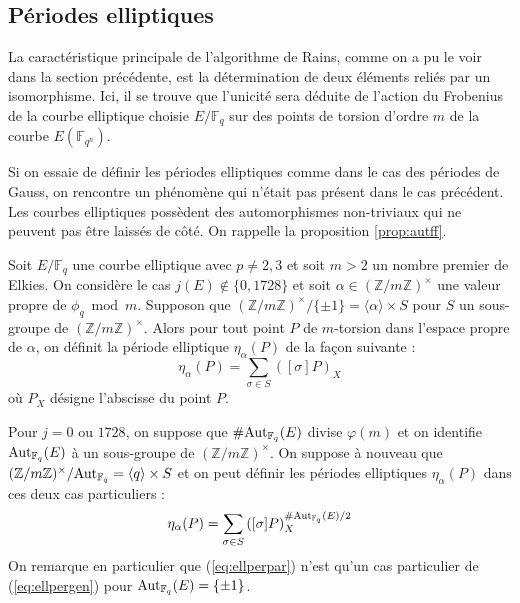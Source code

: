 \documentclass[a4paper]{article} %
\numberwithin{section}{part}
\numberwithin{equation}{section}
\newcommand\zmodninv[1]{(\mathbb{Z}/#1\mathbb{Z})^{\times}}
\newcommand\GF[1]{\mathbb{F}_{#1}}
\newcommand\groupgen[1]{\langle{#1}\rangle}
\begin{document}
\subsection{Périodes elliptiques}
\label{sec:perell}
La caractéristique principale de l'algorithme de Rains, comme on a pu le voir
dans la section précédente, est la détermination de deux éléments reliés
par un isomorphisme. Ici, il se trouve que l'unicité sera déduite de
l'action du Frobenius de la courbe elliptique choisie $E/\GF{q}$ sur des points
de torsion d'ordre $m$ de la courbe $E(\GF{q^n})$.\par
Si on essaie de définir les périodes elliptiques comme dans le cas des périodes
de Gauss, on rencontre un phénomène qui n'était pas présent dans le cas
précédent. Les courbes elliptiques possèdent des automorphismes non-triviaux qui
ne peuvent pas être laissés de côté. On rappelle la proposition
\ref{prop:autff}.\par
\begin{defn}
Soit $E/\GF{q}$ une courbe elliptique avec $p\neq2, 3$ et soit $m > 2$
un nombre premier de Elkies. On considère le cas 
$j(E)\notin\lbrace{0, 1728}\rbrace$ et soit $\alpha\in\zmodninv{m}$ une valeur 
propre de $\phi_q\bmod{m}$. Supposon que $\zmodninv{m}/\lbrace{\pm1}\rbrace = 
\groupgen{\alpha}\times S$ pour $S$ un sous-groupe de $\zmodninv{m}$. Alors pour
tout point $P$ de $m$-torsion dans l'espace propre de $\alpha$, on définit la 
période elliptique $\eta_{\alpha}(P)$ de la façon suivante :
\begin{equation}
\label{eq:ellperpar}
\eta_{\alpha}(P) = \sum_{\sigma\in S}{([\sigma]P)_X}
\end{equation}
où $P_X$ désigne l'abscisse du point $P$.\par
Pour $j = 0$ ou $1728$, on suppose que $\#\textup{Aut}_{\GF{q}}(E)$ divise
$\varphi(m)$ et on identifie $\textup{Aut}_{\GF{q}}(E)$ à un sous-groupe de 
$\zmodninv{m}$. On suppose à nouveau que $\zmodninv{m}/\textup{Aut}_{\GF{q}} = 
\groupgen{q}\times S$ et on peut définir les périodes elliptiques
$\eta_{\alpha}(P)$ dans ces deux cas particuliers :
\begin{equation}
\label{eq:ellpergen}
\eta_{\alpha}(P) = \sum_{\sigma\in S}
{\left([\sigma]P\right)_X^{\#\textup{Aut}_{\GF{q}}(E)/2}}
\end{equation}
On remarque en particulier que (\ref{eq:ellperpar}) n'est qu'un cas particulier
de (\ref{eq:ellpergen}) pour $\textup{Aut}_{\GF{q}}(E) = \lbrace{\pm1}\rbrace$.
\end{defn}
\end{document}

